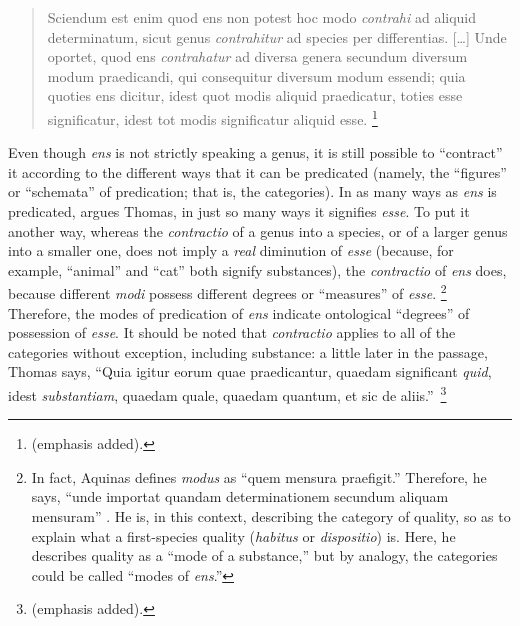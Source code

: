 \begin{quotation}
Sciendum est enim quod ens non potest hoc modo \emph{contrahi} ad aliquid determinatum, sicut genus \emph{contrahitur} ad species per differentias. [\ldots] Unde oportet, quod ens \emph{contrahatur} ad diversa genera secundum diversum modum praedicandi, qui consequitur diversum modum essendi; quia quoties ens dicitur, idest quot modis aliquid praedicatur, toties esse significatur, idest tot modis significatur aliquid esse.%
%
\footnote{\Cite[V, l.~9, n.~5–6 (Marietti n.~889–890)]{st:metaph} (emphasis added).}
%
\end{quotation}
%
Even though \emph{ens} is not strictly speaking a genus, it is still possible to “contract” it according to the different ways that it can be predicated (namely, the “figures” or  “schemata” of predication; that is, the categories). In as many ways as \emph{ens} is predicated, argues Thomas, in just so many ways it signifies \emph{esse}. To put it another way, whereas the \emph{contractio} of a genus into a species, or of a larger genus into a smaller one, does not imply a \emph{real} diminution of \emph{esse} (because, for example, “animal” and “cat” both signify substances), the \emph{contractio} of \emph{ens} does, because different \emph{modi} possess different degrees or “measures” of \emph{esse}.%
%
\footnote{In fact, Aquinas defines \emph{modus} as “quem mensura praefigit.” Therefore, he says, “unde importat quandam determinationem secundum aliquam mensuram” \parencite[I-II, q.~49, a.~2, co.]{st:summa}. He is, in this context, describing the category of quality, so as to explain what a first-species quality (\emph{habitus} or \emph{dispositio}) is. Here, he describes quality as a “mode of a substance,” but by analogy, the categories could be called “modes of \emph{ens}.”}
%
Therefore, the modes of predication of \emph{ens} indicate ontological “degrees” of possession of \emph{esse}. It should be noted that \emph{contractio} applies to all of the categories without exception, including substance: a little later in the passage, Thomas says, “Quia igitur eorum quae praedicantur, quaedam significant \emph{quid}, idest \emph{substantiam}, quaedam quale, quaedam quantum, et sic de aliis.”\,%
%
\footnote{\Cite[V, lib.~5, l.~9 n.~6 (Marietti n.~890)]{st:metaph} (emphasis added).}
%

